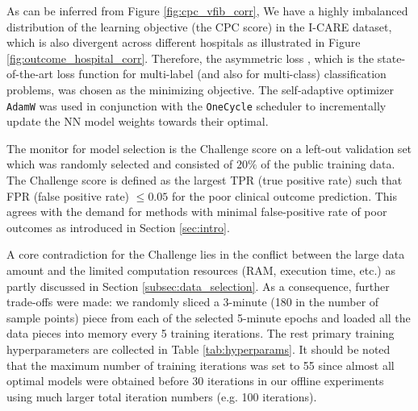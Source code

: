 As can be inferred from Figure \ref{fig:cpc_vfib_corr}, We have a highly imbalanced distribution of the learning objective (the CPC score) in the I-CARE dataset, which is also divergent across different hospitals as illustrated in Figure \ref{fig:outcome_hospital_corr}. Therefore, the asymmetric loss \cite{ridnik2021asymmetric_loss}, which is the state-of-the-art loss function for multi-label (and also for multi-class) classification problems, was chosen as the minimizing objective. The self-adaptive optimizer \texttt{AdamW} was used in conjunction with the \texttt{OneCycle} scheduler to incrementally update the NN model weights towards their optimal.



The monitor for model selection is the Challenge score on a left-out validation set which was randomly selected and consisted of $20\%$ of the public training data. The Challenge score is defined as the largest TPR (true positive rate) such that FPR (false positive rate) $\le 0.05$ for the poor clinical outcome prediction. This agrees with the demand for methods with minimal false-positive rate of poor outcomes as introduced in Section \ref{sec:intro}.

A core contradiction for the Challenge lies in the conflict between the large data amount and the limited computation resources (RAM, execution time, etc.) as partly discussed in Section \ref{subsec:data_selection}. As a consequence, further trade-offs were made: we randomly sliced a 3-minute (180 in the number of sample points) piece from each of the selected 5-minute epochs and loaded all the data pieces into memory every 5 training iterations. The rest primary training hyperparameters are collected in Table \ref{tab:hyperparams}. It should be noted that the maximum number of training iterations was set to 55 since almost all optimal models were obtained before 30 iterations in our offline experiments using much larger total iteration numbers (e.g. 100 iterations).





